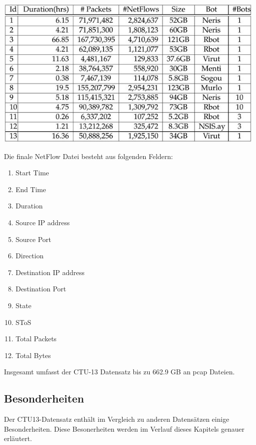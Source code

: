 \documentclass[main.tex]{subfiles}
\begin{document}
\begin{center}
\includegraphics[scale=1]{images/CTU_Tabelle_2.jpg} 
\label{Tabelle: Größe der Daten für jedes Szenario}
\end{center}
Die finale NetFlow Datei besteht aus folgenden Feldern:
\begin{center}
\begin{enumerate}
\item Start Time
\item End Time
\item Duration
\item Source IP address
\item Source Port
\item Direction
\item Destination IP address
\item Destination Port
\item State
\item SToS
\item Total Packets
\item Total Bytes
\end{enumerate}
\end{center}
Insgesamt umfasst der CTU-13 Datensatz bis zu 662.9 GB an pcap Dateien.  \\
\subsection{Besonderheiten}
Der CTU13-Datensatz enthält im Vergleich zu anderen Datensätzen einige Besonderheiten. Diese Besonerheiten werden im Verlauf dieses Kapitels genauer erläutert.
\end{document}
